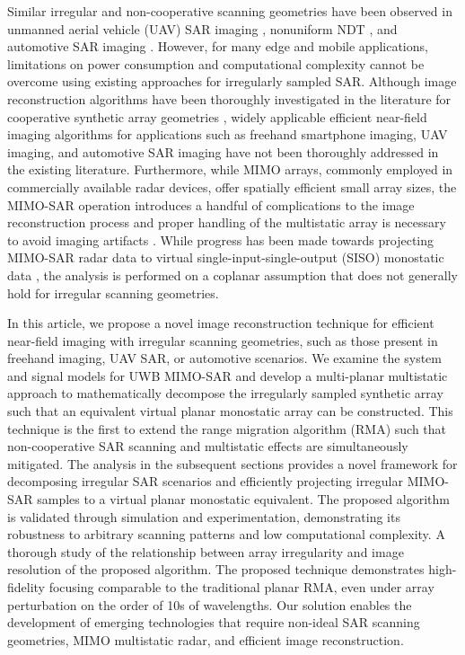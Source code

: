 \documentclass{ieeeaccess}
\begin{document}
Similar irregular and non-cooperative scanning geometries have been observed in unmanned aerial vehicle (UAV) SAR imaging \cite{garcia20203DSARProcessing}, nonuniform NDT \cite{wu2020multilayered}, and automotive SAR imaging \cite{kan2020automotiveSAR}. 
However, for many edge and mobile applications, limitations on power consumption and computational complexity cannot be overcome using existing approaches for irregularly sampled SAR.
Although image reconstruction algorithms have been thoroughly investigated in the literature for cooperative synthetic array geometries \cite{sheen2001three,yanik2019sparse,yanik2019near,yanik2019cascaded,yanik2020development,smith2020nearfieldisar,smith2021An,smith2021sterile,gao2018_1D_MIMO,fan2020linearMIMOArbitraryTopologies,gao2016efficient,lopez20003,amineh2019real,smith2022ThzToolbox}, widely applicable efficient near-field imaging algorithms for applications such as freehand smartphone imaging, UAV imaging, and automotive SAR imaging have not been thoroughly addressed in the existing literature. 
Furthermore, while MIMO arrays, commonly employed in commercially available radar devices, offer spatially efficient small array sizes, the MIMO-SAR operation introduces a handful of complications to the image reconstruction process and proper handling of the multistatic array is necessary to avoid imaging artifacts \cite{yanik2019sparse}.
While progress has been made towards projecting MIMO-SAR radar data to virtual single-input-single-output (SISO) monostatic data \cite{yanik2019sparse,smith2022ThzToolbox}, the analysis is performed on a coplanar assumption that does not generally hold for irregular scanning geometries.

In this article, we propose a novel image reconstruction technique for efficient near-field imaging with irregular scanning geometries, such as those present in freehand imaging, UAV SAR, or automotive scenarios.
We examine the system and signal models for UWB MIMO-SAR and develop a multi-planar multistatic approach to mathematically decompose the irregularly sampled synthetic array such that an equivalent virtual planar monostatic array can be constructed. 
This technique is the first to extend the range migration algorithm (RMA) such that non-cooperative SAR scanning and multistatic effects are simultaneously mitigated. 
The analysis in the subsequent sections provides a novel framework for decomposing irregular SAR scenarios and efficiently projecting irregular MIMO-SAR samples to a virtual planar monostatic equivalent. 
The proposed algorithm is validated through simulation and experimentation, demonstrating its robustness to arbitrary scanning patterns and low computational complexity.
A thorough study of the relationship between array irregularity and image resolution of the proposed algorithm. 
The proposed technique demonstrates high-fidelity focusing comparable to the traditional planar RMA, even under array perturbation on the order of 10s of wavelengths. 
Our solution enables the development of emerging technologies that require non-ideal SAR scanning geometries, MIMO multistatic radar, and efficient image reconstruction.
\end{document}
